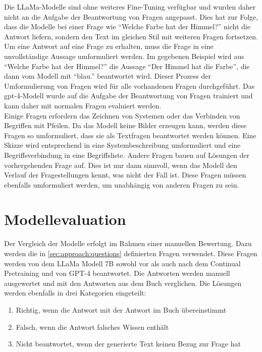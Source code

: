 Die LLaMa-Modelle sind ohne weiteres Fine-Tuning verfügbar und wurden daher nicht an die Aufgabe der Beantwortung von Fragen angepasst.
Dies hat zur Folge, dass die Modelle bei einer Frage wie \enquote{Welche Farbe hat der Himmel?} nicht die Antwort liefern, sondern den Text im gleichen Stil mit weiteren Fragen fortsetzen.
Um eine Antwort auf eine Frage zu erhalten, muss die Frage in eine unvollständige Aussage umformuliert werden.
Im gegebenen Beispiel wird aus \enquote{Welche Farbe hat der Himmel?} die Aussage \enquote{Der Himmel hat die Farbe}, die dann vom Modell mit \enquote{blau.} beantwortet wird.
Dieser Prozess der Umformulierung von Fragen wird für alle vorhandenen Fragen durchgeführt.
Das \ac{gpt}-4-Modell wurde auf die Aufgabe der Beantwortung von Fragen trainiert und kann daher mit normalen Fragen evaluiert werden.\\

Einige Fragen erfordern das Zeichnen von Systemen oder das Verbinden von Begriffen mit Pfeilen.
Da das Modell keine Bilder erzeugen kann, werden diese Fragen so umformuliert, dass sie als Textfragen beantwortet werden können.
Eine Skizze wird entsprechend in eine Systembeschreibung umformuliert und eine Begriffsverbindung in eine Begriffsliste.
Andere Fragen bauen auf Lösungen der vorhergehenden Frage auf.
Dies ist nur dann sinnvoll, wenn das Modell den Verlauf der Fragestellungen kennt, was nicht der Fall ist.
Diese Fragen müssen ebenfalls umformuliert werden, um unabhängig von anderen Fragen zu sein.

\section{Modellevaluation}\label{sec:approach:comparison}
Der Vergleich der Modelle erfolgt im Rahmen einer manuellen Bewertung.
Dazu werden die in \cref{sec:approach:questions} definierten Fragen verwendet.
Diese Fragen werden von dem LLaMa Modell 7B sowohl vor als auch nach dem Continual Pretraining und von GPT-4 beantwortet.
Die Antworten werden manuell ausgewertet und mit den Antworten aus dem Buch \citet{bb} verglichen.
Die Lösungen werden ebenfalls in drei Kategorien eingeteilt:
\begin{enumerate}
    \item Richtig, wenn die Antwort mit der Antwort im Buch übereinstimmt
    \item Falsch, wenn die Antwort falsches Wissen enthält
    \item Nicht beantwortet, wenn der generierte Text keinen Bezug zur Frage hat
\end{enumerate}

